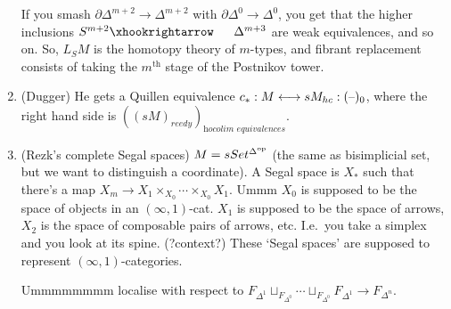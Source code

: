 \begin{AlexandreBousfieldLocalisation}
\begin{enumerate}
If you smash $\partial\Delta^{m+2}\to \Delta^{m+2}$ with $\partial\Delta^0\to\Delta^0$, you get that the higher inclusions $S^{m+2}\cofibration \Delta^{m+3}$ are weak equivalences, and so on. So, $L_SM$ is the homotopy theory of $m$-types, and fibrant replacement consists of taking the $m^\text{th}$ stage of the Postnikov tower.
\item (Dugger) He gets a Quillen equivalence $c_*:M\longleftrightarrow sM_{hc}:(\textup{--})_0$, where the right hand side is $((sM)_{reedy})_{\textit{hocolim equivalences}}$.
\item (Rezk's complete Segal spaces) $M=sSet^{\Delta^{\textup{op}}}$ (the same as bisimplicial set, but we want to distinguish a coordinate). A Segal space is $X_*$ such that there's a map $X_m\to X_1\times_{X_0}\cdots\times_{X_0}X_1$. Ummm $X_0$ is supposed to be the space of objects in an $(\infty,1)$-cat. $X_1$ is supposed to be the space of arrows, $X_2$ is the space of composable pairs of arrows, etc. I.e.\ you take a simplex and you look at its spine. (?context?) These `Segal spaces' are supposed to represent $(\infty,1)$-categories.

Ummmmmmmm localise with respect to $F_{\Delta^1}\sqcup_{F_{\Delta^0}}\cdots\sqcup_{F_{\Delta^0}}F_{\Delta^1}\to F_{\Delta^n}$.
\end{enumerate}
\pagebreak
\end{AlexandreBousfieldLocalisation}
